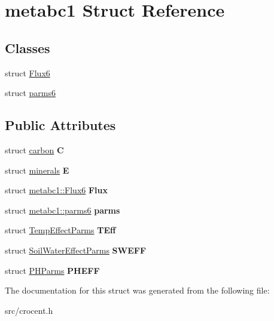 \hypertarget{structmetabc1}{\section{metabc1 Struct Reference}
\label{structmetabc1}
}
\subsection*{Classes}
\begin{DoxyCompactItemize}
\item 
struct \hyperlink{structmetabc1_1_1_flux6}{Flux6}
\item 
struct \hyperlink{structmetabc1_1_1parms6}{parms6}
\end{DoxyCompactItemize}
\subsection*{Public Attributes}
\begin{DoxyCompactItemize}
\item 
\hypertarget{structmetabc1_a7a5a60e548cb8f6f236072240c243d45}{struct \hyperlink{structcarbon}{carbon} {\bfseries C}}\label{structmetabc1_a7a5a60e548cb8f6f236072240c243d45}

\item 
\hypertarget{structmetabc1_afc9cf37e267e47000bf23276cc832e97}{struct \hyperlink{structminerals}{minerals} {\bfseries E}}\label{structmetabc1_afc9cf37e267e47000bf23276cc832e97}

\item 
\hypertarget{structmetabc1_a684eeddc29b15c5ad9cae9b1fe61be83}{struct \hyperlink{structmetabc1_1_1_flux6}{metabc1\-::\-Flux6} {\bfseries Flux}}\label{structmetabc1_a684eeddc29b15c5ad9cae9b1fe61be83}

\item 
\hypertarget{structmetabc1_af34ea07da3b49890775fa553bfb43ca3}{struct \hyperlink{structmetabc1_1_1parms6}{metabc1\-::parms6} {\bfseries parms}}\label{structmetabc1_af34ea07da3b49890775fa553bfb43ca3}

\item 
\hypertarget{structmetabc1_afa6cfd7f2222be2468a1755ccceb2de4}{struct \hyperlink{struct_temp_effect_parms}{Temp\-Effect\-Parms} {\bfseries T\-Eff}}\label{structmetabc1_afa6cfd7f2222be2468a1755ccceb2de4}

\item 
\hypertarget{structmetabc1_a3e613b55c5b7587a766db2fcaa04c5af}{struct \hyperlink{struct_soil_water_effect_parms}{Soil\-Water\-Effect\-Parms} {\bfseries S\-W\-E\-F\-F}}\label{structmetabc1_a3e613b55c5b7587a766db2fcaa04c5af}

\item 
\hypertarget{structmetabc1_a97b1f166e6e7da2fabe1560edf0e8ddd}{struct \hyperlink{struct_p_h_parms}{P\-H\-Parms} {\bfseries P\-H\-E\-F\-F}}\label{structmetabc1_a97b1f166e6e7da2fabe1560edf0e8ddd}

\end{DoxyCompactItemize}


The documentation for this struct was generated from the following file\-:\begin{DoxyCompactItemize}
\item 
src/crocent.\-h\end{DoxyCompactItemize}
